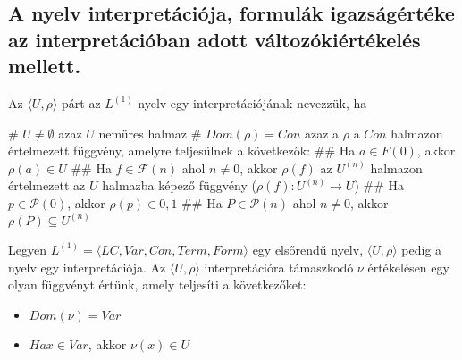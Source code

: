 \subsection{A nyelv interpretációja, formulák igazságértéke az interpretációban adott változókiértékelés mellett.}
\begin{definition}
	Az $\langle U, \rho\rangle$ párt az $L^{(1)}$ nyelv egy interpretációjának nevezzük, ha
	\begin{easylist}
		# $U \neq \emptyset$ azaz $U$ nemüres halmaz
		# $Dom(\rho) = Con$ azaz a $\rho$ a $Con$ halmazon értelmezett függvény, amelyre teljesülnek a következők:
		## Ha $a \in F(0)$, akkor $\rho(a) \in U$
		## Ha $f \in \mathcal{F}(n)$ ahol $n\neq 0$, akkor $\rho(f)$ az $U^{(n)}$ halmazon értelmezett az $U$ halmazba képező függvény ($\rho(f) : U^{(n)} \rightarrow U $)
		## Ha $p \in \mathcal{P}(0)$, akkor $\rho(p) \in {0, 1}$
		## Ha $P \in \mathcal{P}(n)$ ahol $n \neq 0$, akkor $\rho(P) \subseteq U^{(n)}$
	\end{easylist}
\end{definition}
\begin{definition}
	Legyen $L^{(1)} = \langle LC, Var, Con, Term, Form\rangle$ egy elsőrendű nyelv, $\langle U, \rho\rangle$ pedig a nyelv egy interpretációja. Az $\langle U, \rho\rangle$ interpretációra támaszkodó $\nu$ értékelésen egy olyan függvényt értünk, amely teljesíti a következőket:
	\begin{itemize}
		\item  $ Dom(\nu) = Var $
		\item  $ Ha x \in Var$, akkor $\nu(x) \in U $
	\end{itemize}
\end{definition}
